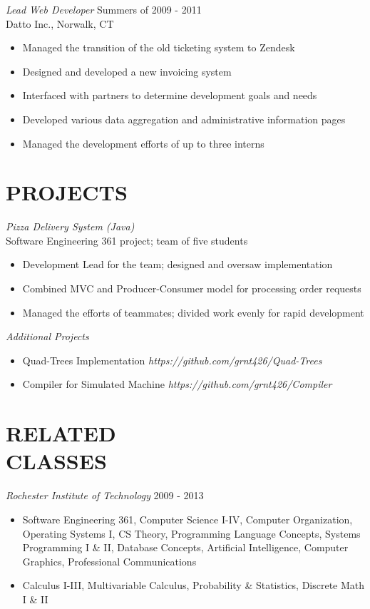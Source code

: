 \documentclass[line,margin]{res}
\begin{document}
\begin{resume}
	{\sl Lead Web Developer} \hfill Summers of 2009 - 2011 \\
                Datto Inc., Norwalk, CT
                 \begin{itemize}  \itemsep -2pt %
	\item Managed the transition of the old ticketing system to Zendesk
	\item Designed and developed a new invoicing system
	\item Interfaced with partners to determine development goals and needs
	\item Developed various data aggregation and administrative information pages
	\item Managed the development efforts of up to three interns
	\end{itemize}
 
 
\section{PROJECTS}  

	{\sl Pizza Delivery System (Java)} \\
	Software Engineering 361 project; team of five students
	  \begin{itemize}  \itemsep -2pt %
	\item Development Lead for the team; designed and oversaw implementation
	\item Combined MVC and Producer-Consumer model for processing order requests
	\item Managed the efforts of teammates; divided work evenly for rapid development
                \end{itemize}

	{\sl Additional Projects}
	 \begin{itemize}  \itemsep -2pt %
		\item Quad-Trees Implementation {\sl https://github.com/grnt426/Quad-Trees}
		\item Compiler for Simulated Machine {\sl https://github.com/grnt426/Compiler}
	 \end{itemize}

\section{RELATED \\ CLASSES} {\sl Rochester Institute of Technology} \hfill 2009 - 2013
	\begin{itemize}  \itemsep -2pt %
	\item Software Engineering 361, Computer Science I-IV, Computer Organization, Operating Systems I, CS Theory, Programming Language Concepts, Systems Programming I \& II, Database Concepts, Artificial Intelligence, Computer Graphics, Professional Communications
	\item Calculus I-III, Multivariable Calculus, Probability \& Statistics, Discrete Math I \& II
	\end{itemize}


\end{resume}
\end{document}
